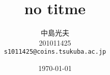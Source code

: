 \documentclass{jsarticle}
\begin{document}
\title{no titme}
\author{中島光夫\\201011425\\\texttt{s1011425@coins.tsukuba.ac.jp}}
\date{\today}
\maketitle
\end{document}
